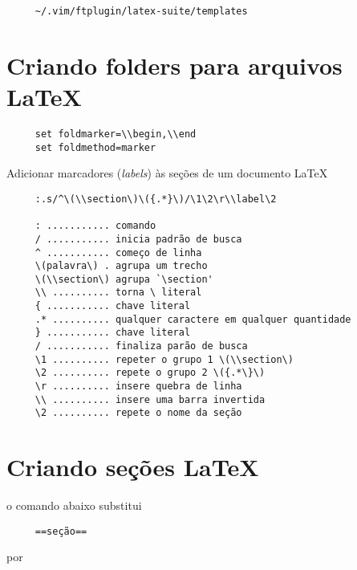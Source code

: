 \begin{verbatim}
     ~/.vim/ftplugin/latex-suite/templates
\end{verbatim}


\section{Criando folders para arquivos \LaTeX}
\label{Criando folders para arquivos LaTeX}

\begin{verbatim}
     set foldmarker=\\begin,\\end
     set foldmethod=marker
\end{verbatim}

Adicionar marcadores ({\em labels}) às seções de um documento \LaTeX
\begin{verbatim}
     :.s/^\(\\section\)\({.*}\)/\1\2\r\\label\2
     
     : ........... comando
     / ........... inicia padrão de busca
     ^ ........... começo de linha
     \(palavra\) . agrupa um trecho
     \(\\section\) agrupa `\section'
     \\ .......... torna \ literal
     { ........... chave literal
     .* .......... qualquer caractere em qualquer quantidade
     } ........... chave literal
     / ........... finaliza parão de busca
     \1 .......... repeter o grupo 1 \(\\section\) 
     \2 .......... repete o grupo 2 \({.*\}\)
     \r .......... insere quebra de linha
     \\ .......... insere uma barra invertida
     \2 .......... repete o nome da seção
\end{verbatim}

\section{Criando seções \LaTeX}\label{Criando seções latex}
o comando abaixo substitui

\begin{verbatim}
     ==seção==
\end{verbatim}

   por

